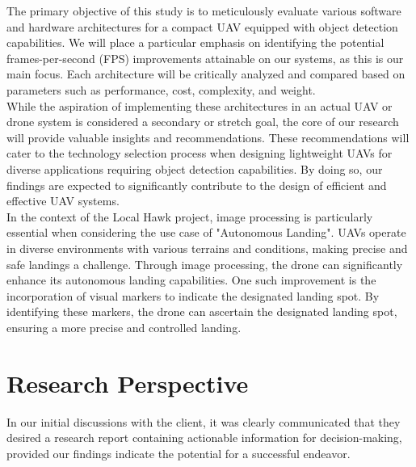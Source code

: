 
The primary objective of this study is to meticulously evaluate various software and hardware architectures for a compact UAV equipped with object detection capabilities. We will place a particular emphasis on identifying the potential frames-per-second (FPS) improvements attainable on our systems, as this is our main focus. Each architecture will be critically analyzed and compared based on parameters such as performance, cost, complexity, and weight.\\

While the aspiration of implementing these architectures in an actual UAV or drone system is considered a secondary or stretch goal, the core of our research will provide valuable insights and recommendations. These recommendations will cater to the technology selection process when designing lightweight UAVs for diverse applications requiring object detection capabilities. By doing so, our findings are expected to significantly contribute to the design of efficient and effective UAV systems.\\

In the context of the Local Hawk project, image processing is particularly essential when considering the use case of "Autonomous Landing". UAVs operate in diverse environments with various terrains and conditions, making precise and safe landings a challenge. Through image processing, the drone can significantly enhance its autonomous landing capabilities. One such improvement is the incorporation of visual markers to indicate the designated landing spot. By identifying these markers, the drone can ascertain the designated landing spot, ensuring a more precise and controlled landing.

\section{Research Perspective}

In our initial discussions with the client, it was clearly communicated that they desired a research report containing actionable information for decision-making, provided our findings indicate the potential for a successful endeavor.\\

